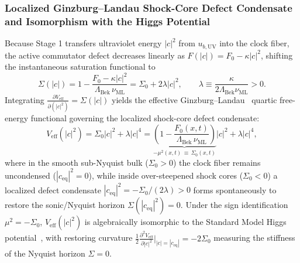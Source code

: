 \documentclass[11pt,a4paper]{article}
\theoremstyle{definition}
\begin{document}
\subsubsection{Localized Ginzburg--Landau Shock-Core Defect Condensate and Isomorphism with the Higgs Potential}
Because Stage 1 transfers ultraviolet energy $|c|^2$ from $u_{b,\text{UV}}$ into the clock fiber, the active commutator defect decreases linearly as $F(|c|) = F_0 - \kappa |c|^2$, shifting the instantaneous saturation functional to
\begin{equation}
\Sigma(|c|) = 1 - \frac{F_0 - \kappa |c|^2}{\Lambda_{\text{Bek}} \, \nu_{\text{ML}}} = \Sigma_0 + 2\lambda |c|^2, \qquad \lambda \equiv \frac{\kappa}{2\Lambda_{\text{Bek}}\nu_{\text{ML}}} > 0.
\end{equation}
Integrating $\frac{\partial V_{\text{eff}}}{\partial (|c|^2)} = \Sigma(|c|)$ yields the effective Ginzburg--Landau~\cite{ginzburg1950} quartic free-energy functional governing the localized shock-core defect condensate:
\begin{equation}
V_{\text{eff}}(|c|^2) = \Sigma_0 |c|^2 + \lambda |c|^4 = \underbrace{\left( 1 - \frac{F_0(x,t)}{\Lambda_{\text{Bek}} \, \nu_{\text{ML}}} \right)}_{-\mu^2(x,t) \, \equiv \, \Sigma_0(x,t)} |c|^2 + \lambda |c|^4,
\end{equation}
where in the smooth sub-Nyquist bulk ($\Sigma_0 > 0$) the clock fiber remains uncondensed ($|c_{\text{eq}}|^2 = 0$), while inside over-steepened shock cores ($\Sigma_0 < 0$) a localized defect condensate $|c_{\text{eq}}|^2 = -\Sigma_0 / (2\lambda) > 0$ forms spontaneously to restore the sonic/Nyquist horizon $\Sigma(|c_{\text{eq}}|^2) = 0$. Under the sign identification $\mu^2 = -\Sigma_0$, $V_{\text{eff}}(|c|^2)$ is algebraically isomorphic to the Standard Model Higgs potential~\cite{higgs1964,lee1977,tooby2024}, with restoring curvature $\frac{1}{2}\frac{\partial^2 V_{\text{eff}}}{\partial |c|^2}\big|_{|c|=|c_{\text{eq}}|} = -2\Sigma_0$ measuring the stiffness of the Nyquist horizon $\Sigma = 0$.
\end{document}
